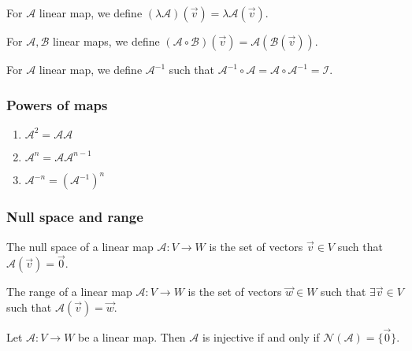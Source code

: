 \begin{theorem}
    For $\mathcal{A}$ linear map, we define $(\lambda \mathcal{A})(\vec{v}) = \lambda \mathcal{A}(\vec{v})$.
\end{theorem}

\begin{theorem}[Composition]
    For $\mathcal{A}, \mathcal{B}$ linear maps, we define $(\mathcal{A} \circ \mathcal{B})(\vec{v}) = \mathcal{A}(\mathcal{B}(\vec{v}))$.
\end{theorem}

\begin{theorem}[Inverse]
    For $\mathcal{A}$ linear map, we define $\mathcal{A}^{-1}$ such that $\mathcal{A}^{-1} \circ \mathcal{A} = \mathcal{A} \circ \mathcal{A}^{-1} = \mathcal{I}$.
\end{theorem}

\subsubsection{Powers of maps}
\begin{enumerate}
    \item $\mathcal{A}^2 = \mathcal{A}\mathcal{A}$
    \item $\mathcal{A}^n = \mathcal{A}\mathcal{A}^{n-1}$
    \item $\mathcal{A}^{-n} = (\mathcal{A}^{-1})^n$
\end{enumerate}

\subsubsection{Null space and range}
\begin{definition}
    The null space of a linear map $\mathcal{A}: V \to W$ is the set of vectors $\vec{v} \in V$ such that $\mathcal{A}(\vec{v}) = \vec{0}$.
\end{definition}

\begin{definition}[Range]
    The range of a linear map $\mathcal{A}: V \to W$ is the set of vectors $\vec{w} \in W$ such that $\exists \vec{v} \in V$ such that $\mathcal{A}(\vec{v}) = \vec{w}$.
\end{definition}

\begin{theorem}
    Let $\mathcal{A}: V \to W$ be a linear map. Then $\mathcal{A}$ is injective if and only if $\mathcal{N}(\mathcal{A}) = \{\vec{0}\}$.
\end{theorem}


